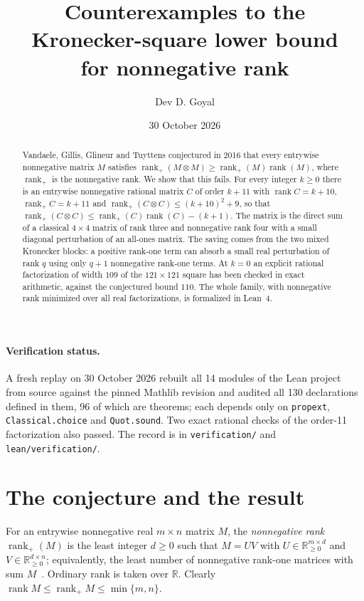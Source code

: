 \documentclass[11pt]{article}
\title{\textbf{Counterexamples to the Kronecker-square lower bound\\for nonnegative rank}}
\author{Dev D. Goyal}
\date{30 October 2026}
\theoremstyle{remark}
\newcommand{\code}[1]{\nolinkurl{#1}}
\newcommand{\rk}{\operatorname{rank}}
\newcommand{\rp}{\operatorname{rank}_+}
\newcommand{\replaystatus}{A fresh replay on 30 October 2026 rebuilt all 14 modules of the Lean project from source against the pinned Mathlib revision and audited all 130 declarations defined in them, 96 of which are theorems; each depends only on \code{propext}, \code{Classical.choice} and \code{Quot.sound}. Two exact rational checks of the order-11 factorization also passed. The record is in \code{verification/} and \code{lean/verification/}.}
\begin{document}
\maketitle

\begin{abstract}
Vandaele, Gillis, Glineur and Tuyttens conjectured in 2016 that every entrywise nonnegative matrix $M$ satisfies $\rp(M\otimes M)\ge\rp(M)\rk(M)$, where $\rp$ is the nonnegative rank. We show that this fails. For every integer $k\ge0$ there is an entrywise nonnegative rational matrix $C$ of order $k+11$ with $\rk C=k+10$, $\rp C=k+11$ and $\rp(C\otimes C)\le(k+10)^2+9$, so that $\rp(C\otimes C)\le\rp(C)\rk(C)-(k+1)$. The matrix is the direct sum of a classical $4\times4$ matrix of rank three and nonnegative rank four with a small diagonal perturbation of an all-ones matrix. The saving comes from the two mixed Kronecker blocks: a positive rank-one term can absorb a small real perturbation of rank $q$ using only $q+1$ nonnegative rank-one terms. At $k=0$ an explicit rational factorization of width $109$ of the $121\times121$ square has been checked in exact arithmetic, against the conjectured bound $110$. The whole family, with nonnegative rank minimized over all real factorizations, is formalized in Lean~4.
\end{abstract}

\paragraph{Verification status.} \replaystatus

\section{The conjecture and the result}\label{sec:result}

For an entrywise nonnegative real $m\times n$ matrix $M$, the \emph{nonnegative rank} $\rp(M)$ is the least integer $d\ge0$ such that $M=UV$ with $U\in\mathbb{R}_{\ge0}^{m\times d}$ and $V\in\mathbb{R}_{\ge0}^{d\times n}$; equivalently, the least number of nonnegative rank-one matrices with sum $M$~\cite{CR}. Ordinary rank is taken over $\mathbb{R}$. Clearly $\rk M\le\rp M\le\min\{m,n\}$.
\end{document}
